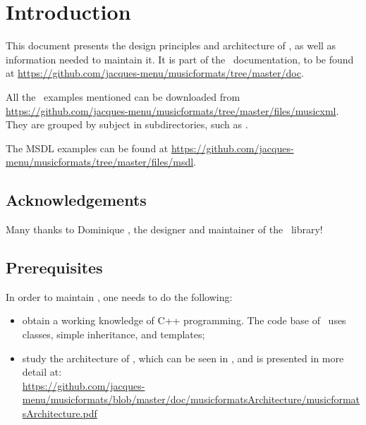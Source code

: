 
\chapter{Introduction}

This document presents the design principles and architecture of \mf, as well as information needed to maintain it. It is part of the \mf\ documentation, to be found at \url{https://github.com/jacques-menu/musicformats/tree/master/doc}.

All the \mxml\ examples mentioned can be downloaded from \url{https://github.com/jacques-menu/musicformats/tree/master/files/musicxml}.\\
They are grouped by subject in subdirectories, such as .

The MSDL examples can be found at \url{https://github.com/jacques-menu/musicformats/tree/master/files/msdl}.


\section{Acknowledgements}

Many thanks to Dominique \fober, the designer and maintainer of the \libmusicxml\ library!


\section{Prerequisites}

In order to maintain \mf, one needs to do the following:
\begin{itemize}
\item obtain a working knowledge of C++ programming. The code base of \mf\ uses classes, simple inheritance, and templates;


\item study the architecture of \mf, which can be seen in , and is presented in more detail at:\\
\url{https://github.com/jacques-menu/musicformats/blob/master/doc/musicformatsArchitecture/musicformatsArchitecture.pdf}
\end{itemize}


